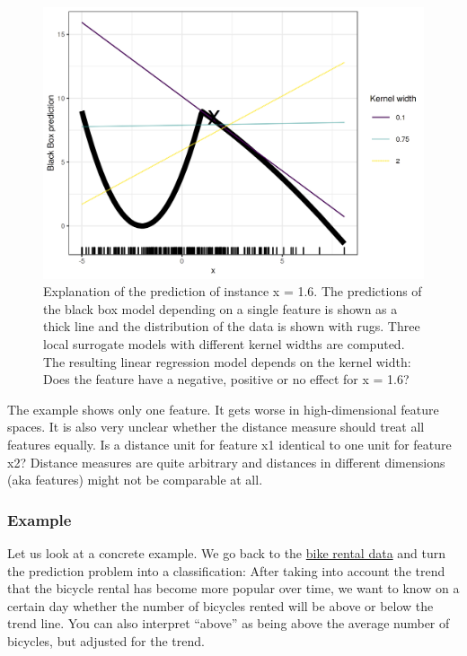 \documentclass[12pt,]{krantz}
\begin{document}
\begin{figure}

{\centering \includegraphics[width=\textwidth]{images/lime-fail-1} 

}

\caption{Explanation of the prediction of instance x = 1.6. The predictions of the black box model depending on a single feature is shown as a thick line and the distribution of the data is shown with rugs. Three local surrogate models with different kernel widths are computed. The resulting linear regression model depends on the kernel width: Does the feature have a negative, positive or no effect for x = 1.6?}\label{fig:lime-fail}
\end{figure}

The example shows only one feature. It gets worse in high-dimensional
feature spaces. It is also very unclear whether the distance measure
should treat all features equally. Is a distance unit for feature x1
identical to one unit for feature x2? Distance measures are quite
arbitrary and distances in different dimensions (aka features) might not
be comparable at all.

\subsubsection{Example}\label{example-5}

Let us look at a concrete example. We go back to the
\protect\hyperlink{bike-data}{bike rental data} and turn the prediction
problem into a classification: After taking into account the trend that
the bicycle rental has become more popular over time, we want to know on
a certain day whether the number of bicycles rented will be above or
below the trend line. You can also interpret ``above'' as being above
the average number of bicycles, but adjusted for the trend.
\end{document}
